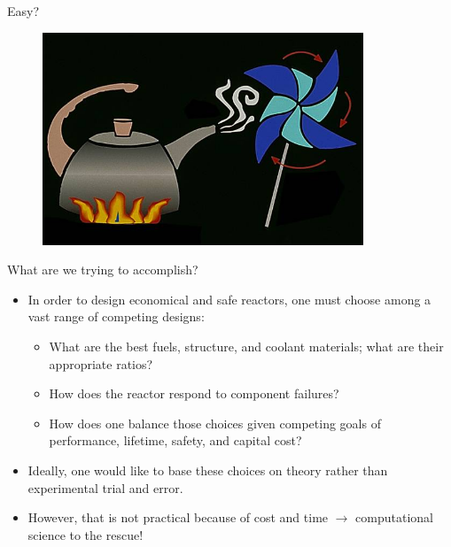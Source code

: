 \documentclass[xcolor=x11names,compress]{beamer}
\renewcommand{\(}{\begin{columns}}
\renewcommand{\)}{\end{columns}}
\newcommand{\<}[1]{\begin{column}{#1}}
\renewcommand{\>}{\end{column}}
\begin{document}
\begin{frame}{Easy?}
 \begin{figure}
   \begin{center}
     \includegraphics[height=2.5in,clip]{TeaPot}
   \end{center}
 \end{figure}
\end{frame}

\begin{frame}{What are we trying to accomplish?}
\begin{itemize}
\item In order to design economical and safe reactors, one must choose among a vast range of competing designs:
\begin{itemize}
\item What are the best fuels, structure, and coolant materials; what are their appropriate ratios?
\item How does the reactor respond to component failures?
\item How does one balance those choices given competing goals of performance, lifetime, safety, and capital cost?
\end{itemize}
\item Ideally, one would like to base these choices on theory rather than experimental trial and error.
\item However, that is not practical because of cost and time $\rightarrow$ computational science to the rescue!
\end{itemize}
\end{frame}
\end{document}
